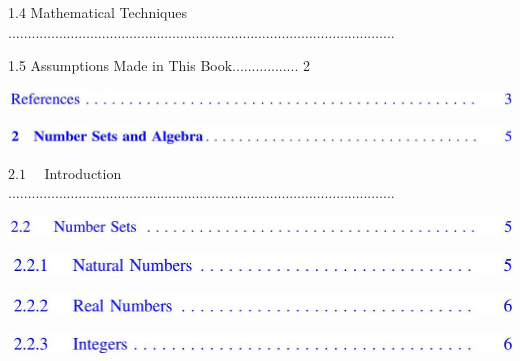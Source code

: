 \documentclass[10pt]{article}
\begin{document}
1.4 Mathematical Techniques $\ldots \ldots \ldots \ldots \ldots \ldots \ldots \ldots \ldots \ldots \ldots \ldots \ldots \ldots \ldots \ldots \ldots \ldots \ldots \ldots \ldots \ldots \ldots \ldots \ldots \ldots \ldots \ldots \ldots \ldots \ldots \ldots \ldots$

1.5 Assumptions Made in This Book................. 2

\begin{center}
\includegraphics[max width=\textwidth]{2023_04_20_41f1ceac5a31dc7d1b59g-009(16)}
\end{center}

\begin{center}
\includegraphics[max width=\textwidth]{2023_04_20_41f1ceac5a31dc7d1b59g-009(12)}
\end{center}

$2.1 \quad$ Introduction $\ldots \ldots \ldots \ldots \ldots \ldots \ldots \ldots \ldots \ldots \ldots \ldots \ldots \ldots \ldots \ldots \ldots \ldots \ldots \ldots \ldots \ldots \ldots \ldots \ldots \ldots \ldots \ldots \ldots \ldots \ldots \ldots \ldots$

\begin{center}
\includegraphics[max width=\textwidth]{2023_04_20_41f1ceac5a31dc7d1b59g-009(6)}
\end{center}

\begin{center}
\includegraphics[max width=\textwidth]{2023_04_20_41f1ceac5a31dc7d1b59g-009(10)}
\end{center}

\begin{center}
\includegraphics[max width=\textwidth]{2023_04_20_41f1ceac5a31dc7d1b59g-009(11)}
\end{center}

\begin{center}
\includegraphics[max width=\textwidth]{2023_04_20_41f1ceac5a31dc7d1b59g-009(5)}
\end{center}
\end{document}
